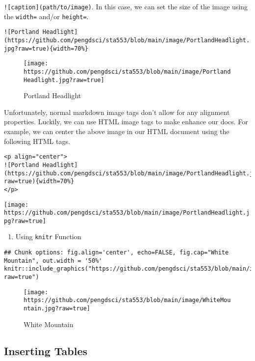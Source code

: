 \documentclass[
]{article}
\providecommand{\tightlist}{%
  \setlength{\itemsep}{0pt}\setlength{\parskip}{0pt}}
\begin{document}
\texttt{!{[}caption{]}(path/to/image)}. In this case, we can set the
size of the image using the \texttt{width=} and/or \texttt{height=}.

\texttt{!{[}Portland\ Headlight{]}(https://github.com/pengdsci/sta553/blob/main/image/PortlandHeadlight.jpg?raw=true)\{width=70\%\}}

\begin{figure}
\centering
\texttt{[image: https://github.com/pengdsci/sta553/blob/main/image/PortlandHeadlight.jpg?raw=true]}
\caption{Portland Headlight}
\end{figure}

Unfortunately, normal markdown image tags don't allow for any alignment
properties. Luckily, we can use HTML image tags to make enhance our
docs. For example, we can center the above image in our HTML document
using the following HTML tags.

\begin{verbatim}
<p align="center">
![Portland Headlight](https://github.com/pengdsci/sta553/blob/main/image/PortlandHeadlight.jpg?raw=true){width=70%}
</p>
\end{verbatim}

\texttt{[image: https://github.com/pengdsci/sta553/blob/main/image/PortlandHeadlight.jpg?raw=true]}

\begin{enumerate}
\def\labelenumi{\arabic{enumi}.}
\setcounter{enumi}{2}
\tightlist
\item
  Using \texttt{knitr} Function
\end{enumerate}

\begin{verbatim}
## Chunk options: fig.align='center', echo=FALSE, fig.cap="White Mountain", out.width = '50%'
knitr::include_graphics("https://github.com/pengdsci/sta553/blob/main/image/WhiteMountain.jpg?raw=true")
\end{verbatim}

\begin{figure}

{\centering \texttt{[image: https://github.com/pengdsci/sta553/blob/main/image/WhiteMountain.jpg?raw=true]} 

}

\caption{White Mountain}\label{fig:unnamed-chunk-2}
\end{figure}

\hypertarget{inserting-tables}{%
\subsection{Inserting Tables}\label{inserting-tables}}
\end{document}
